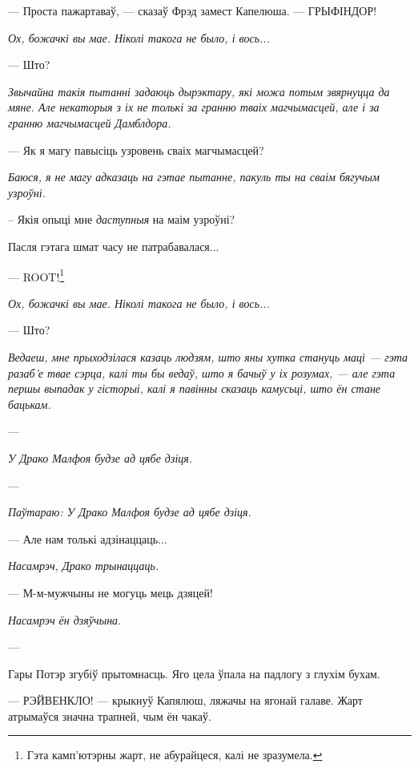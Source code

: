 --- Проста пажартаваў, --- сказаў Фрэд замест Капелюша. --- ГРЫФІНДОР!

\later


\emph{Ох, божачкі вы мае. Ніколі такога не было, і вось...}

--- Што?

\emph{Звычайна такія пытанні задаюць дырэктару, які можа потым звярнуцца да мяне.
Але некаторыя з іх не толькі за гранню тваіх магчымасцей, але і за гранню 
магчымасцей Дамблдора.}

--- Як я магу павысіць узровень сваіх магчымасцей?

\emph{Баюся, я не магу адказаць на гэтае пытанне, пакуль ты на сваім бягучым 
узроўні.}


-- Якія опыці мне \emph{даступныя} на маім узроўні?

Пасля гэтага шмат часу не патрабавалася...

--- ROOT!\footnote{{} Гэта камп'ютэрны жарт, не абурайцеся, калі не зразумела.}

\later

\emph{Ох, божачкі вы мае. Ніколі такога не было, і вось...}

--- Што?

\emph{Ведаеш, мне прыходзілася казаць людзям, што яны хутка стануць маці ---
гэта разаб'е твае сэрца, калі ты бы ведаў, што я бачыў у іх розумах, ---
але гэта першы выпадак у гісторыі, калі я павінны сказаць камусьці, што 
ён стане бацькам.}

--- \emph{}

\emph{У Драко Малфоя будзе ад цябе дзіця.}

--- \emph{}

\emph{Паўтараю: У Драко Малфоя будзе ад цябе дзіця.}

--- Але нам толькі адзінаццаць...

\emph{Насамрэч, Драко трынаццаць.}

--- М-м-мужчыны не могуць мець дзяцей!

\emph{Насамрэч ён дзяўчына.}

--- 

\emph{}

Гары Потэр згубіў прытомнасць. Яго цела ўпала на падлогу з глухім бухам.

--- РЭЙВЕНКЛО! --- крыкнуў Капялюш, ляжачы на ягонай галаве. Жарт атрымаўся 
значна трапней, чым ён чакаў.

